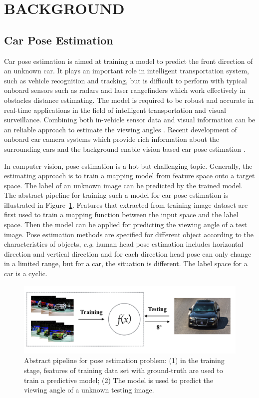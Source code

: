 \documentclass{tutmscthesis}[2010/09/22]
\numberwithin{equation}{section}
\numberwithin{table}{section}
\numberwithin{figure}{section}
\def\onedot{. }
\def\eg{\emph{e.g}\onedot} \def\Eg{\emph{E.g}\onedot}
\begin{document}
\section{BACKGROUND}
\label{sec:literatures}

\subsection{Car Pose Estimation}
\label{sec:carpose}
Car pose estimation is aimed at training a model to predict the front direction of an unknown car. 	
It plays an important role in intelligent transportation system, such as vehicle recognition and tracking, but is difficult to perform with typical onboard sensors such as radars and laser rangefinders which work effectively in obstacles distance estimating. 
The model is required to be robust and accurate in real-time applications in the field of intelligent transportation and visual surveillance.
Combining both in-vehicle sensor data and visual information \cite{nillson2014transaction} can be an reliable approach to estimate the viewing angles . 
Recent development of onboard car camera systems which provide rich information about the surrounding cars and the background enable vision based car pose estimation \cite{seppa2008transaction}. 

In computer vision, pose estimation is a hot but challenging topic.
Generally, the estimating approach is to train a mapping model from feature space onto a  target space. 
The label of an unknown image can be predicted by the trained model.
The abstract pipeline for training such a model for car pose estimation is illustrated in Figure~\ref{Fig:pipeline of pose estimation problem}. 
Features that extracted from training image dataset are first used to train a mapping function between the input space and the label space.
Then the model can be applied for predicting the viewing angle of a test image.
Pose estimation methods are specified for different object according to the characteristics of objects, \eg human head pose estimation includes horizontal direction and vertical direction and for each direction head pose can only change in a limited range, but for a car, the situation is different. 
The label space for a car is a cyclic.

\begin{figure}[h]
\centering
\includegraphics[width=0.98\linewidth]{pose-estimation.png}
\caption{Abstract pipeline for pose estimation problem: (1) in the training stage, features of training data set with ground-truth are used to train a predictive model; (2) The model is used to predict the viewing angle of a unknown testing image.}
\label{Fig:pipeline of pose estimation problem} %
\end{figure}
\end{document}
